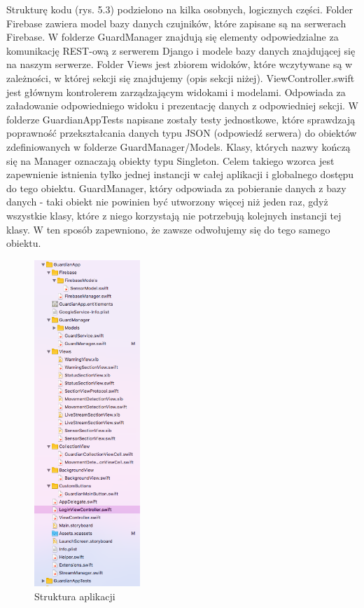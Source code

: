 Strukturę kodu (rys. 5.3) podzielono na kilka osobnych, logicznych części. Folder Firebase zawiera model bazy danych czujników, które zapisane są na serwerach Firebase. W folderze GuardManager znajdują się elementy odpowiedzialne za komunikację REST-ową z serwerem Django i modele bazy danych znajdującej się na naszym serwerze. Folder Views jest zbiorem widoków, które wczytywane są w zależności, w której sekcji się znajdujemy (opis sekcji niżej). ViewController.swift jest głównym kontrolerem zarządzającym widokami i modelami. Odpowiada za załadowanie odpowiedniego widoku i prezentację danych z odpowiedniej sekcji. W folderze GuardianAppTests napisane zostały testy jednostkowe, które sprawdzają poprawność przekształcania danych typu JSON (odpowiedź serwera) do obiektów zdefiniowanych w folderze GuardManager/Models. Klasy, których nazwy kończą się na Manager oznaczają obiekty typu Singleton. Celem takiego wzorca jest zapewnienie istnienia tylko jednej instancji w całej aplikacji i globalnego dostępu do tego obiektu. GuardManager, który odpowiada za pobieranie danych z bazy danych - taki obiekt nie powinien być utworzony więcej niż jeden raz, gdyż wszystkie klasy, które z niego korzystają nie potrzebują kolejnych instancji tej klasy. W ten sposób zapewniono, że zawsze odwołujemy się do tego samego obiektu.
\begin{figure}[ht]
	\centering
	\includegraphics[width=4cm]{iOSstructure}
	\caption{Struktura aplikacji}
\end{figure}
